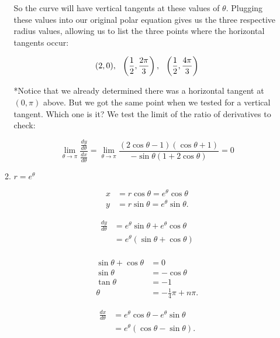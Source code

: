 \documentclass[12pt,oneside,english]{amsart}
\begin{document}
\begin{enumerate}[leftmargin=*]
\begin{enumerate}
\begin{multicols}{2}
\end{multicols}

So the curve will have vertical tangents at these values of $\theta$. Plugging these values into our original polar equation gives us the three respective radius values, allowing us to list the three points where the horizontal tangents occur:

\[
(2,0),\hspace{0.25cm}\left(\frac{1}{2},\frac{2\pi}{3}\right),\hspace{0.25cm}\left(\frac{1}{2},\frac{4\pi}{3}\right)
\]

*Notice that we already determined there was a horizontal tangent at $(0,\pi)$ above. But we got the same point when we tested for a vertical tangent. Which one is it? We test the limit of the ratio of derivatives to check:

\[
\lim_{\theta\rightarrow\pi}\frac{\frac{dy}{d\theta}}{\frac{dx}{d\theta}}=\lim_{\theta\rightarrow\pi}\frac{(2\cos\theta-1)(\cos\theta+1)}{-\sin\theta(1+2\cos\theta)}=0
\]
\vspace{0.5cm}

\item $r=e^\theta$

\begin{align*}
x&=r\cos\theta=e^\theta\cos\theta \\
y&=r\sin\theta=e^\theta\sin\theta.
\end{align*}

\begin{multicols}{2}

\begin{align*}
\frac{dy}{d\theta}&=e^\theta\sin\theta+e^\theta\cos\theta \\
&=e^\theta(\sin\theta+\cos\theta) \\
\end{align*}

\begin{align*}
\sin\theta+\cos\theta&=0 \\
\sin\theta&=-\cos\theta \\
\tan\theta&=-1 \\
\theta&=-\frac{1}{4}\pi+n\pi.
\end{align*}

\columnbreak

\begin{align*}
\frac{dx}{d\theta}&=e^\theta\cos\theta-e^\theta\sin\theta \\
&=e^\theta(\cos\theta-\sin\theta). \\
\end{align*}


\end{multicols}
\end{enumerate}
\end{enumerate}
\end{document}
